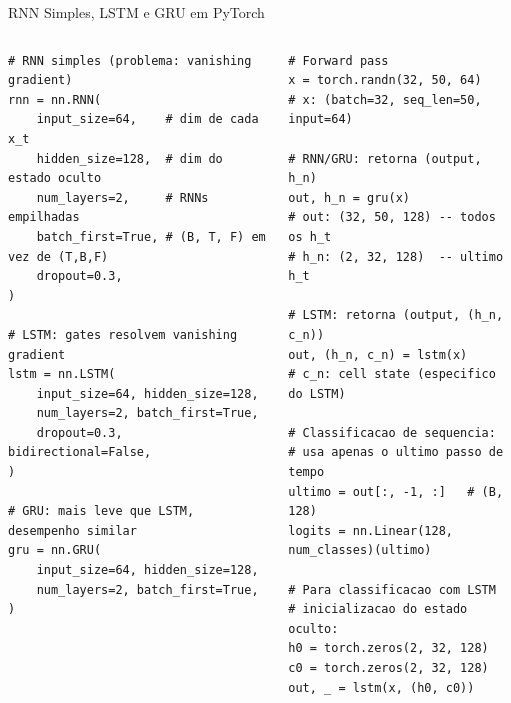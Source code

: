 \documentclass[aspectratio=169, 10pt]{beamer}
\begin{document}
\begin{frame}[fragile]{RNN Simples, LSTM e GRU em PyTorch}
\begin{columns}
\begin{lstlisting}
# RNN simples (problema: vanishing gradient)
rnn = nn.RNN(
    input_size=64,    # dim de cada x_t
    hidden_size=128,  # dim do estado oculto
    num_layers=2,     # RNNs empilhadas
    batch_first=True, # (B, T, F) em vez de (T,B,F)
    dropout=0.3,
)

# LSTM: gates resolvem vanishing gradient
lstm = nn.LSTM(
    input_size=64, hidden_size=128,
    num_layers=2, batch_first=True,
    dropout=0.3, bidirectional=False,
)

# GRU: mais leve que LSTM, desempenho similar
gru = nn.GRU(
    input_size=64, hidden_size=128,
    num_layers=2, batch_first=True,
)
\end{lstlisting}

\begin{lstlisting}
# Forward pass
x = torch.randn(32, 50, 64)
# x: (batch=32, seq_len=50, input=64)

# RNN/GRU: retorna (output, h_n)
out, h_n = gru(x)
# out: (32, 50, 128) -- todos os h_t
# h_n: (2, 32, 128)  -- ultimo h_t

# LSTM: retorna (output, (h_n, c_n))
out, (h_n, c_n) = lstm(x)
# c_n: cell state (especifico do LSTM)

# Classificacao de sequencia:
# usa apenas o ultimo passo de tempo
ultimo = out[:, -1, :]   # (B, 128)
logits = nn.Linear(128, num_classes)(ultimo)

# Para classificacao com LSTM
# inicializacao do estado oculto:
h0 = torch.zeros(2, 32, 128)
c0 = torch.zeros(2, 32, 128)
out, _ = lstm(x, (h0, c0))
\end{lstlisting}
\end{columns}
\end{frame}

\end{document}
